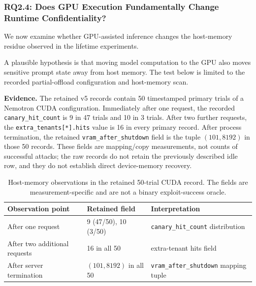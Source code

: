 \documentclass[journal,tifs]{IEEEtran}
\begin{document}
\subsubsection{RQ2.4: Does GPU Execution Fundamentally Change Runtime
Confidentiality?}
\label{sec:rq2_gpu}

We now examine whether GPU-assisted inference changes the host-memory
residue observed in the lifetime experiments.

A plausible hypothesis is that moving model computation to the GPU also
moves sensitive prompt state away from host memory. The test below is
limited to the recorded partial-offload configuration and host-memory
scan.


{\bf Evidence.}
The retained v5 records contain 50 timestamped primary trials of a
Nemotron CUDA configuration. Immediately after one request, the recorded
	\texttt{canary\_hit\_count} is 9 in 47 trials and 10 in 3 trials. After two further
	requests, the \texttt{extra\_tenants[*].hits} value is 16 in every primary record.
	After process termination, the retained \texttt{vram\_after\_shutdown} field is
the tuple $(101,8192)$ in those 50 records. These fields are mapping/copy
measurements, not counts of successful attacks; the raw records do not
retain the previously described idle row, and they do not establish direct
device-memory recovery.

\begin{table}[!t]
    \centering
    \caption{\small Host-memory observations in the retained 50-trial CUDA
    record. The fields are measurement-specific and are not a binary
    exploit-success oracle.}
    \label{tab:vram}
    \scriptsize
    \begin{tabular}{@{}p{}p{}p{}@{}}
        \toprule
        Observation point & Retained field & Interpretation \\
        \midrule
        After one request
            & 9 (47/50), 10 (3/50)
            & \texttt{canary\_hit\_count} distribution \\
        After two additional requests
            & 16 in all 50
            & extra-tenant hits field \\
        After server termination
            & $(101,8192)$ in all 50
            & \texttt{vram\_after\_shutdown} mapping tuple \\
        \bottomrule
    \end{tabular}
    \vspace{-0.5cm}
\end{table}
\end{document}
